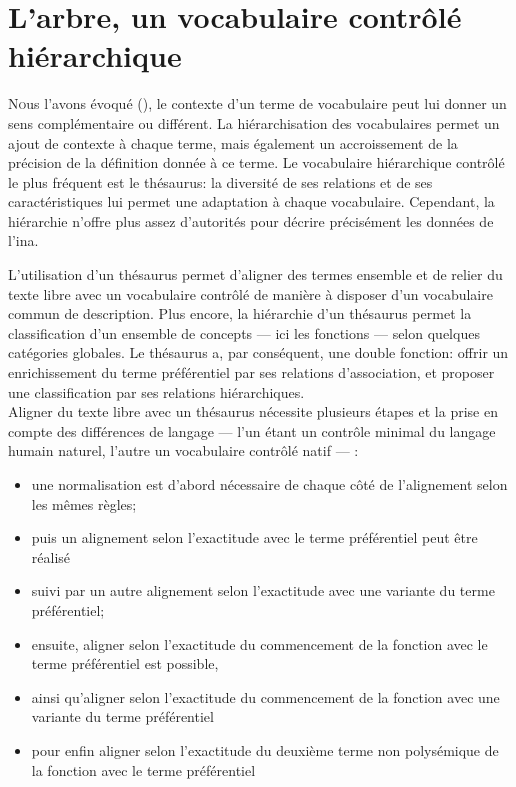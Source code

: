 \chapter{\label{I-C}L'arbre, un vocabulaire contrôlé hiérarchique}

\lettrine{N}ous l'avons évoqué (), le contexte d'un terme de vocabulaire peut lui donner un sens complémentaire ou différent. La hiérarchisation des vocabulaires permet un ajout de contexte à chaque terme, mais également un accroissement de la précision de la définition donnée à ce terme. Le vocabulaire hiérarchique contrôlé le plus fréquent est le thésaurus: la diversité de ses relations et de ses caractéristiques lui permet une adaptation à chaque vocabulaire. Cependant, la hiérarchie n'offre plus assez d'autorités pour décrire précisément les données de l'\ac{ina}.








\bigskip
\bigskip
\bigskip
L'utilisation d'un thésaurus permet d'aligner des termes ensemble et de relier du texte libre avec un vocabulaire contrôlé de manière à disposer d'un vocabulaire commun de description. Plus encore, la hiérarchie d'un thésaurus permet la classification d'un ensemble de concepts --- ici les fonctions --- selon quelques catégories globales. Le thésaurus a, par conséquent, une double fonction: offrir un enrichissement du terme préférentiel par ses relations d'association, et proposer une classification par ses relations hiérarchiques.\\

Aligner du texte libre avec un thésaurus nécessite plusieurs étapes et la prise en compte des différences de langage --- l'un étant un contrôle minimal du langage humain naturel, l'autre un vocabulaire contrôlé natif --- :
\begin{itemize}
	\item une normalisation est d'abord nécessaire de chaque côté de l'alignement selon les mêmes règles;
	\item puis un alignement selon l'exactitude avec le terme préférentiel peut être réalisé
	\item suivi par un autre alignement selon l'exactitude avec une variante du terme préférentiel;
	\item ensuite, aligner selon l'exactitude du commencement de la fonction avec le terme préférentiel est possible, 
	\item ainsi qu'aligner selon l'exactitude du commencement de la fonction avec une variante du terme préférentiel
	\item pour enfin aligner selon l'exactitude du deuxième terme non polysémique de la fonction avec le terme préférentiel
\end{itemize}

